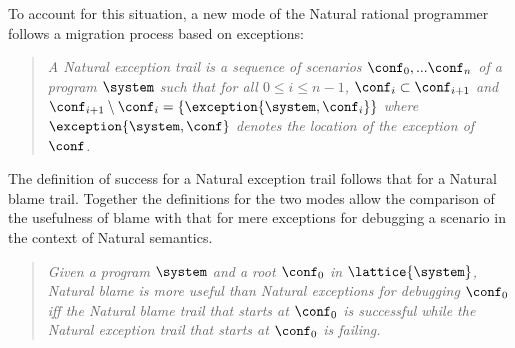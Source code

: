 To account for this situation, a new mode of the Natural rational
programmer follows a migration process based on exceptions:
\begin{quote}
\it A {\em Natural exception trail\/} is a sequence of scenarios $\conf_0,...\conf_n$ of a
program $\system$ such that for all $0 \leq i \leq n - 1$, $\conf_i \subset
\conf_{i+1}$ and $\conf_{i+1} \setminus \conf_i = \{\exception{\system, \conf_i}\}$
where $\exception{\system, \conf}$ denotes the location of the exception of $\conf$.
\end{quote}

The definition of success for a Natural exception trail follows that for
a Natural blame trail.
Together the definitions for the two modes allow the comparison of the usefulness of blame 
with that for mere exceptions for debugging a scenario in the context of Natural semantics.
\begin{quote}
\it 
  Given a program $\system$ and a root $\conf_0$ in $\lattice{\system}$,
  Natural blame is \emph{more useful} than Natural exceptions for
  debugging $\conf_0$ iff 
  the Natural blame trail 
  that starts at $\conf_0$ is successful while the Natural exception trail that
  starts at $\conf_0$ is failing.
\end{quote}
